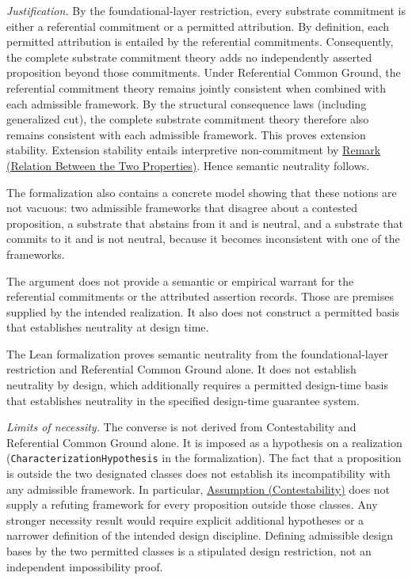 \documentclass[11pt]{article}
\theoremstyle{plain}
\theoremstyle{definition}
\theoremstyle{remark}
\newcommand{\AssumpRef}[2]{\hyperref[#1]{Assumption (#2)}}
\newcommand{\RemRef}[2]{\hyperref[#1]{Remark (#2)}}
\begin{document}
\emph{Justification.}
By the foundational-layer restriction, every substrate commitment is
either a referential commitment or a permitted attribution.
By definition, each permitted attribution is entailed by the
referential commitments.
Consequently, the complete substrate commitment theory adds no
independently asserted proposition beyond those commitments.
Under Referential Common Ground, the referential commitment theory
remains jointly consistent when combined with each admissible framework.
By the structural consequence laws (including generalized cut),
the complete substrate commitment theory therefore also remains
consistent with each admissible framework.
This proves extension stability.
Extension stability entails interpretive non-commitment by
\RemRef{se100.remark.PropertyRelation}{Relation Between the Two Properties}.
Hence semantic neutrality follows.

The formalization also contains a concrete model showing that these notions
are not vacuous:
two admissible frameworks that disagree about a contested proposition,
a substrate that abstains from it and is neutral, and
a substrate that commits to it and is not neutral,
because it becomes inconsistent with one of the frameworks.

The argument does not provide a semantic or empirical warrant for
the referential commitments or the attributed assertion records.
Those are premises supplied by the intended realization.
It also does not construct a permitted basis that establishes neutrality
at design time.

The Lean formalization proves semantic neutrality from the
foundational-layer restriction and Referential Common Ground alone.
It does not establish neutrality by design, which additionally
requires a permitted design-time basis that establishes neutrality
in the specified design-time guarantee system.

\emph{Limits of necessity.}
The converse is not derived from Contestability and Referential Common Ground alone.
It is imposed as a hypothesis on a realization
(\texttt{CharacterizationHypothesis} in the formalization).
The fact that a proposition is outside the two designated classes
does not establish its incompatibility with any admissible framework.
In particular,
\AssumpRef{se100.assump.Contestability}{Contestability}
does not supply a refuting framework for every proposition outside
those classes.
Any stronger necessity result would require explicit additional
hypotheses or a narrower definition of the intended design discipline.
Defining admissible design bases by the two permitted classes is a
stipulated design restriction, not an independent impossibility proof.
\end{document}
